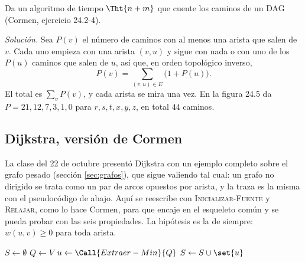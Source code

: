 \documentclass[11pt,letterpaper]{article}
\begin{document}
\begin{ejercicio}
  Da un algoritmo de tiempo $\Tht{n + m}$ que cuente los caminos de un
  DAG (Cormen, ejercicio 24.2-4).

  \textit{Solución.} Sea $P(v)$ el número de caminos con al menos una
  arista que salen de $v$. Cada uno empieza con una arista $(v, u)$ y
  sigue con nada o con uno de los $P(u)$ caminos que salen de $u$, así
  que, en orden topológico inverso,
  \[
    P(v) = \sum_{(v, u) \in E} \bigl(1 + P(u)\bigr) .
  \]
  El total es $\sum_v P(v)$, y cada arista se mira una vez. En la
  figura 24.5 da $P = 21, 12, 7, 3, 1, 0$ para $r, s, t, x, y, z$, en
  total $44$ caminos.
\end{ejercicio}


\subsection*{Dijkstra, versión de Cormen}

La clase del 22 de octubre presentó Dijkstra con un ejemplo completo
sobre el grafo pesado (sección \ref{sec:grafos}), que sigue valiendo
tal cual: un grafo no dirigido se trata como un par de arcos opuestos
por arista, y la traza es la misma con el pseudocódigo de abajo. Aquí
se reescribe con \textsc{Inicializar-Fuente} y \textsc{Relajar}, como
lo hace Cormen, para que encaje en el esqueleto común y se pueda
probar con las seis propiedades. La hipótesis es la de siempre:
$w(u, v) \ge 0$ para toda arista.

\begin{algorithm}[H]
\caption{\textsc{Dijkstra}$(G, w, s)$, versión de Cormen}
\label{alg:dijkstra-cormen}
\begin{algorithmic}[1]
  \State {}
  \State $S \gets \emptyset$
  \State $Q \gets V$ 
    \State $u \gets \Call{Extraer-Min}{Q}$
    \State $S \gets S \cup \set{u}$ 
      \State {} 
    \EndFor
  \EndWhile
\EndProcedure
\end{algorithmic}
\end{algorithm}
\end{document}
